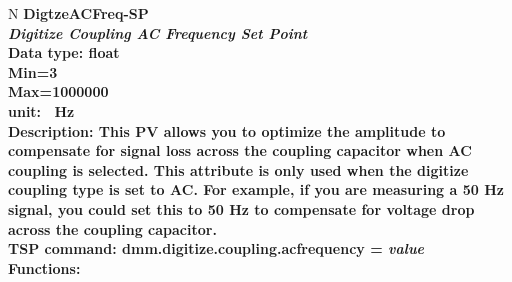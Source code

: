 \documentclass[openany]{article}
\begin{document}
		\begin{tabular}{N}
			\hline
			\bfseries DigtzeACFreq-SP\label{pv:digtzeacfreq-sp} \\ \hline
			\emph{Digitize Coupling AC Frequency Set Point} \\
			Data type: float \\
			Min=3\\
			Max=1000000 \\
			unit: \SI{}{\hertz} \\
			Description: This PV allows you to optimize the amplitude to compensate for signal loss across the coupling capacitor when AC coupling is selected. This attribute is only used when the digitize coupling type is set to AC. For example, if you are measuring a 50 Hz signal, you could set this to 50 Hz to compensate for voltage drop across the coupling capacitor. \\
			TSP command: dmm.digitize.coupling.acfrequency = \emph{value} \\
			Functions: \\
			\arrayrulecolor{\FuncTableBorderColor}

		\end{tabular}
\end{document}
